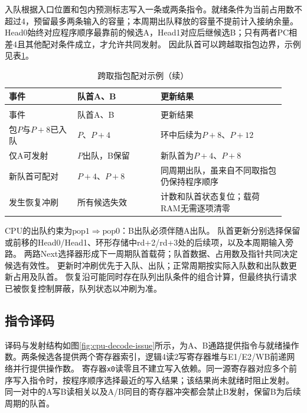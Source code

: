 入队根据入口位置和包内预测标志写入一条或两条指令。就绪条件为当前占用数不超过4，预留最多两条输入的容量；本周期出队释放的容量不提前计入接纳余量。
Head0始终对应程序顺序最靠前的候选A，Head1对应后继候选B；只有两者PC相差4且其他配对条件成立，才允许共同发射。
因此队首可以跨越取指包边界，示例见表\ref{tbl:fifo-cross-packet}。

\begin{reporttable}
\begin{longtable}{@{}p{0.23\linewidth}p{0.28\linewidth}p{0.42\linewidth}@{}}
\caption{跨取指包配对示例}\label{tbl:fifo-cross-packet}\\
\toprule
事件 & 队首A、B & 更新结果 \\
\midrule
\endfirsthead
\caption[]{跨取指包配对示例（续）}\\
\toprule
事件 & 队首A、B & 更新结果 \\
\midrule
\endhead
\bottomrule
\endfoot
包$P$与$P+8$已入队 & $P$、$P+4$ & 环中后续为$P+8$、$P+12$ \\
仅A可发射 & $P$出队，B保留 & 新队首为$P+4$、$P+8$ \\
新队首可配对 & $P+4$、$P+8$ & 同周期出队，虽来自不同取指包仍保持程序顺序 \\
发生恢复冲刷 & 所有候选失效 & 计数和队首状态复位；载荷RAM无需逐项清零 \\
\end{longtable}
\end{reporttable}

CPU的出队约束为$\mathrm{pop1}\Rightarrow\mathrm{pop0}$：B出队必须伴随A出队。
队首更新分别选择保留或前移的Head0/Head1、环形存储中rd+2/rd+3处的后续项，以及本周期输入旁路。
两路Next选择器形成下一周期队首载荷；队首数据、占用数及指针共同决定候选有效性。
更新时冲刷优先于入队、出队；正常周期按实际入队数和出队数更新占用及队首。
恢复沿可能同时存在队列出队条件的组合计算，但最终执行请求已被恢复控制屏蔽，队列状态以冲刷为准。

\subsection{指令译码}

译码与发射结构如图\ref{fig:cpu-decode-issue}所示，为A、B通路提供指令与就绪操作数。两条候选各提供两个寄存器索引，逻辑4读2写寄存器堆与E1/E2/WB前递网络并行提供操作数。
寄存器\texttt{x0}读零且不建立写入依赖。同一源寄存器对应多个前序写入指令时，按程序顺序选择最近的写入结果；该结果尚未就绪时阻止发射。
同一对中的A写B读相关以及A/B同目的寄存器冲突都会禁止B发射，保留B为后续周期的队首。

